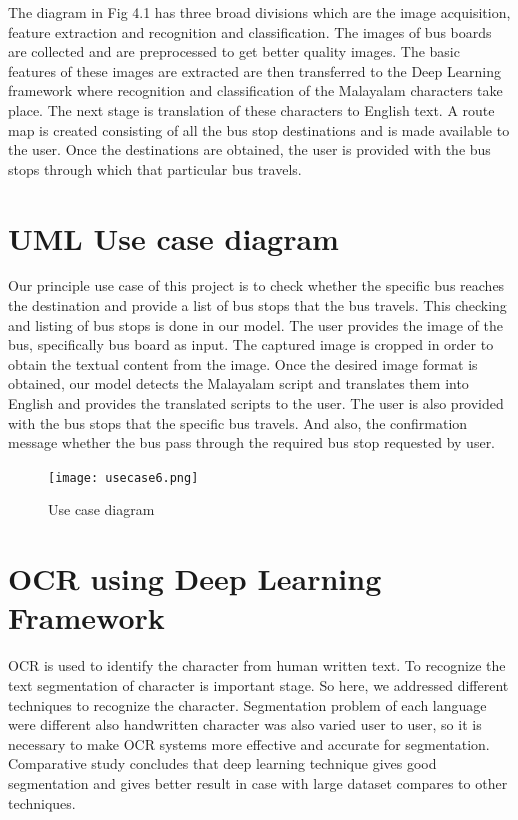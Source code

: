 \documentclass[a4paper,12pt]{report}
\begin{document}
The diagram in Fig 4.1 has three broad divisions which are the image acquisition, feature extraction and recognition and classification. The images of bus boards are collected and are preprocessed to get better quality images. The basic features of these images are extracted are then transferred to the Deep Learning framework where recognition and classification of the Malayalam characters take place. The next stage is translation of these characters to English text. A route map is created consisting of all the bus stop destinations and is made available to the user. Once the destinations are obtained, the user is provided with the bus stops through which that particular bus travels. 

\section{UML Use case diagram}
Our principle use case of this project is to check whether the specific bus reaches the destination and provide a list of bus stops that the bus travels. This checking and listing of bus stops is done in our model.  The user provides the image of the bus, specifically bus board as input. The captured image is cropped in order to obtain the textual content from the image. Once the desired image format is obtained, our model detects the Malayalam script and translates them into English and provides the translated scripts to the user. The user is also provided with the bus stops that the specific bus travels. And also, the confirmation message whether the bus pass through the required bus stop requested by user.

\vspace*{0.1cm}
\begin{figure}[!h]
	\begin{center}
		\texttt{[image: usecase6.png]}    
		\caption{Use case diagram}
		\label{fig1}
	\end{center}
\end{figure}
\vspace*{0.2cm}

\section{OCR using Deep Learning Framework}
OCR is used to identify the character from human written text. To recognize the text segmentation of character is important stage. So here, we addressed different techniques to recognize the character. Segmentation problem of each language were different also handwritten character was also varied user to user, so it is necessary to make OCR systems more effective and accurate for segmentation. Comparative study concludes that deep learning technique gives good segmentation and gives better result in case with large dataset compares to other techniques.
\end{document}
